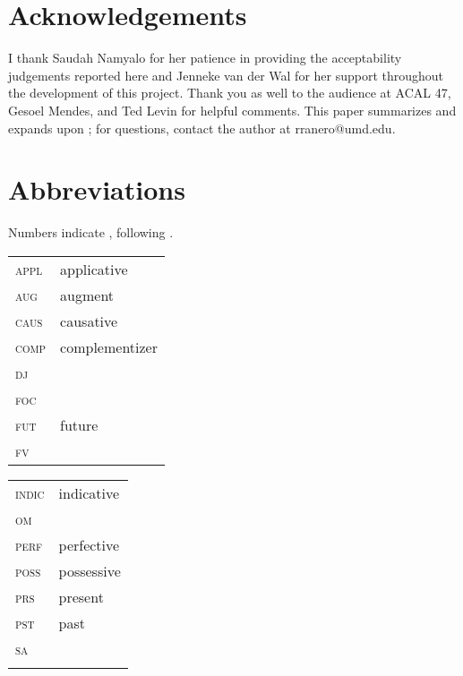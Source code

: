 \documentclass[output=paper
,newtxmath
,modfonts
,nonflat]{langsci/langscibook}
\begin{document}
\section*{Acknowledgements}

I thank Saudah Namyalo for her patience in providing the acceptability judgements reported here and Jenneke van der Wal for her support throughout the development of this project. Thank you as well to the audience at ACAL 47, Gesoel Mendes, and Ted Levin for helpful comments. This paper summarizes and expands upon \citet{ranero2015}; for questions, contact the author at rranero@umd.edu.

\section*{Abbreviations}

Numbers indicate  , following \citet{Hyman1990}. 

\noindent
\begin{tabularx}{.45\textwidth}{lQ}
\textsc{appl} & applicative\\
\textsc{aug} & augment \\
\textsc{caus} & causative \\
\textsc{comp} & complementizer \\
\textsc{dj} & \\
\textsc{foc} & \\
\textsc{fut} & future\\
\textsc{fv} & \\
\end{tabularx}
\begin{tabularx}{.45\textwidth}{lQ}
\textsc{indic} & indicative\\
\textsc{om} & \\
\textsc{perf} & perfective\\
\textsc{poss} & possessive\\
\textsc{prs} & present\\
\textsc{pst} & past\\
\textsc{sa} &  \\
\\
\end{tabularx}

\sloppy
\printbibliography[heading=subbibliography,notkeyword=this]
\end{document}
